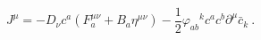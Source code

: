 \begin{equation}
 J^{\mu} = -D_{\nu} c^a (F_{a}^{\mu \nu} + B_{a} \eta^{\mu \nu})
-\frac{1}{2} {\varphi_{ab}}^{k} c^{a} c^{b}\partial^{\mu}{\bar{c}}_{k}~. 
\end{equation}


